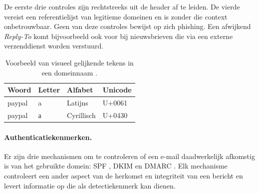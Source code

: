 De eerste drie controles zijn rechtstreeks uit de header af te leiden. De vierde vereist een referentielijst van legitieme domeinen en is zonder die context onbetrouwbaar. Geen van deze controles bewijst op zich phishing. Een afwijkend \emph{Reply-To} komt bijvoorbeeld ook voor bij nieuwsbrieven die via een externe verzenddienst worden verstuurd.

\begin{table}[htbp]
  \centering
  \begin{tabular}{llll}
    \toprule
    \textbf{Woord} & \textbf{Letter} & \textbf{Alfabet} & \textbf{Unicode} \\
    \midrule
    paypal & a & Latijns    & U+0061 \\
    paypal & а & Cyrillisch & U+0430 \\
    \bottomrule
  \end{tabular}
  \caption[Voorbeeld van homografische domeinnamen]{\label{tab:homograaf}Voorbeeld van visueel gelijkende tekens in een domeinnaam \autocite{Davis2026}.}
\end{table}

\paragraph{Authenticatiekenmerken.}
\label{subsec:afzender-headers:authenticatiekenmerken}
Er zijn drie mechanismen om te controleren of een e-mail daadwerkelijk afkomstig is van het gebruikte domein: SPF \autocite{Kitterman2014}, DKIM \autocite{Crocker2011} en DMARC \autocite{Herr2026}. Elk mechanisme controleert een ander aspect van de herkomst en integriteit van een bericht en levert informatie op die als detectiekenmerk kan dienen.

